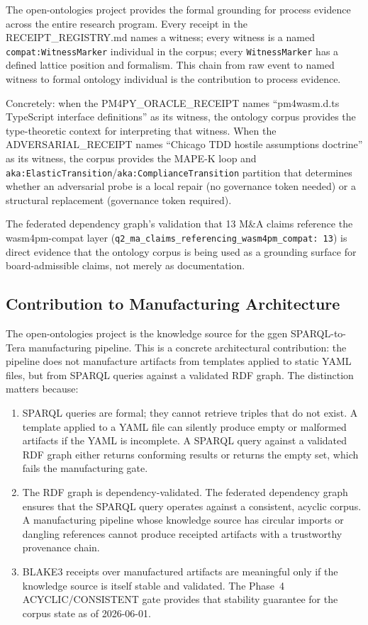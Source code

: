 The open-ontologies project provides the formal grounding for process evidence across the
entire research program. Every receipt in the RECEIPT\_REGISTRY.md names a witness;
every witness is a named \texttt{compat:WitnessMarker} individual in the corpus; every
\texttt{WitnessMarker} has a defined lattice position and formalism. This chain from
raw event to named witness to formal ontology individual is the contribution to process
evidence.

Concretely: when the PM4PY\_ORACLE\_RECEIPT names ``pm4wasm.d.ts TypeScript interface
definitions'' as its witness, the ontology corpus provides the type-theoretic context
for interpreting that witness. When the ADVERSARIAL\_RECEIPT names ``Chicago TDD hostile
assumptions doctrine'' as its witness, the corpus provides the MAPE-K loop and
\texttt{aka:ElasticTransition}/\texttt{aka:ComplianceTransition} partition that determines
whether an adversarial probe is a local repair (no governance token needed) or a structural
replacement (governance token required).

The federated dependency graph's validation that 13 M\&A claims reference the wasm4pm-compat
layer (\texttt{q2\_ma\_claims\_referencing\_wasm4pm\_compat: 13}) is direct evidence that
the ontology corpus is being used as a grounding surface for board-admissible claims, not
merely as documentation.

\subsection{Contribution to Manufacturing Architecture}
\label{sec:research-open-ontologies-contrib-manufacturing}

The open-ontologies project is the knowledge source for the ggen SPARQL-to-Tera manufacturing
pipeline. This is a concrete architectural contribution: the pipeline does not manufacture
artifacts from templates applied to static YAML files, but from SPARQL queries against a
validated RDF graph. The distinction matters because:

\begin{enumerate}
  \item SPARQL queries are formal; they cannot retrieve triples that do not exist.
        A template applied to a YAML file can silently produce empty or malformed artifacts
        if the YAML is incomplete. A SPARQL query against a validated RDF graph either
        returns conforming results or returns the empty set, which fails the manufacturing
        gate.
  \item The RDF graph is dependency-validated. The federated dependency graph ensures that
        the SPARQL query operates against a consistent, acyclic corpus. A manufacturing
        pipeline whose knowledge source has circular imports or dangling references cannot
        produce receipted artifacts with a trustworthy provenance chain.
  \item BLAKE3 receipts over manufactured artifacts are meaningful only if the knowledge
        source is itself stable and validated. The Phase~4 ACYCLIC/CONSISTENT gate
        provides that stability guarantee for the corpus state as of 2026-06-01.
\end{enumerate}

